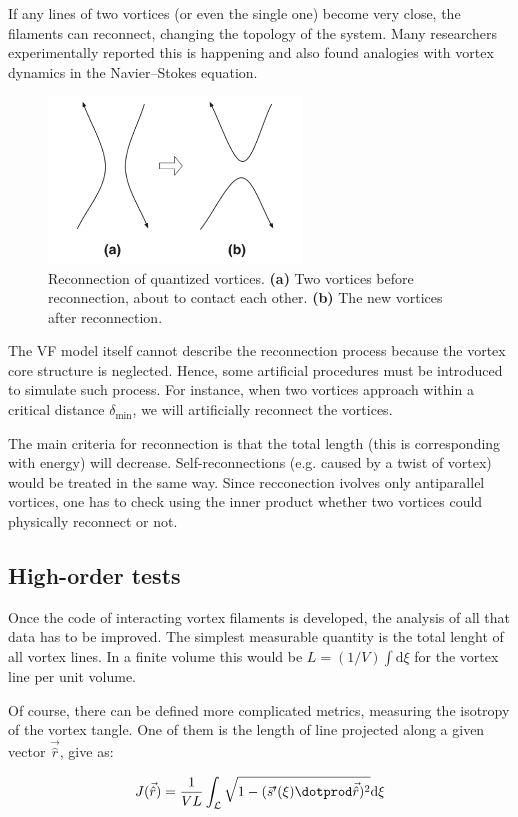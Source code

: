 If any lines of two vortices (or even the single one) become very close,
the filaments can reconnect, changing the topology of the system.
Many researchers experimentally reported this is happening and also found analogies with vortex dynamics in the Navier–Stokes equation.

\begin{figure}[h]
	\centering
	\includegraphics[width=0.6\textwidth]{graphics/simul/reconnection}
	\caption{Reconnection of quantized vortices. \textbf{(a)} Two vortices before reconnection, about to contact each other. \textbf{(b)} The new vortices after reconnection.}
\end{figure}

The VF model itself cannot describe the reconnection process because the vortex core structure is neglected. Hence, some artificial procedures must be introduced to simulate such process. For instance, when two vortices approach within a critical distance $\delta_{\text{min}}$, we will artificially reconnect the vortices.

The main criteria for reconnection is that the total length (this is corresponding with energy) will decrease. Self-reconnections (e.g. caused by a twist of vortex) would be treated in the same way. Since recconection ivolves only antiparallel vortices, one has to check using the inner product whether two vortices could physically reconnect or not.

\subsection*{High-order tests}

Once the code of interacting vortex filaments is developed, the analysis of all that data has to be improved. The simplest measurable quantity is the total lenght of all vortex lines. In a finite volume this would be $L = (1/V) \int \text{d}\xi$ for the vortex line per unit volume.

Of course, there can be defined more complicated metrics, measuring the isotropy of the vortex tangle. One of them is the length of line projected along a given vector $\vec{\hat{r}}$, give as:

\begin{equation}
J(\vec{\hat{r}}) = \frac{1}{VL} \int_{\mathcal{L}} \sqrt{1 - (\vec{s}^{\prime}(\xi) \dotprod \vec{\hat{r}})^2} \text{d}\xi
\end{equation}




\newpage
